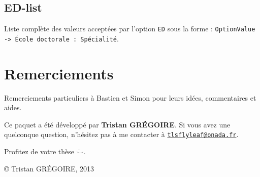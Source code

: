 \documentclass{scrartcl}
\newcommand*{\mail}[1]{\href{mailto:#1}{\texttt{#1}}}
\begin{document}
\subsection{ED-list\label{ssec:ED}}
Liste compl\`ete des valeurs accept\'ees par l'option \texttt{ED} sous la forme :
\texttt{OptionValue -> \'Ecole doctorale : Sp\'ecialit\'e}.


\section*{Remerciements}
Remerciements particuliers \`a Bastien et Simon pour leurs id\'ees, commentaires et aides.

\noindent Ce paquet a \'et\'e d\'evelopp\'e par \textbf{Tristan GR\'EGOIRE}.
Si vous avez une quelconque question, n'h\'esitez pas \`a me contacter \`a \mail{tlsflyleaf@onada.fr}.

\medskip
\noindent\smiley \hfill Profitez de votre th\`ese $\ddot\smile$. \hfill \smiley

\bigskip
\hfill \copyright{} Tristan GR\'EGOIRE, 2013
\end{document}
